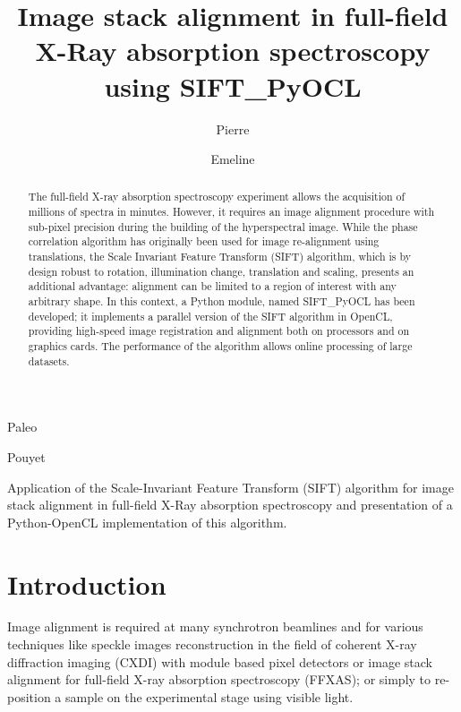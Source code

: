 \documentclass[preprint]{iucr}
\begin{document}
\title{Image stack alignment in full-field X-Ray absorption spectroscopy using
SIFT\_PyOCL}

    \author[a]{Pierre}{Paleo}
    \author[a]{Emeline}{Pouyet}

\maketitle

\begin{synopsis}
Application of the Scale-Invariant Feature Transform (SIFT) algorithm for image
stack alignment in full-field X-Ray absorption spectroscopy and presentation of
a Python-OpenCL implementation of this algorithm.
\end{synopsis}

\begin{abstract}
The full-field X-ray absorption spectroscopy experiment allows the acquisition
of millions of spectra in minutes. However, it requires an image alignment
procedure with sub-pixel precision during the building of the
hyperspectral image.
While the phase correlation algorithm has originally been used for image
re-alignment using translations, the Scale Invariant Feature Transform (SIFT)
algorithm, which is by design robust to rotation, illumination change,
translation and scaling, presents an additional advantage: alignment can be limited to
a region of interest with any arbitrary shape.
In this context, a Python module, named  SIFT\_PyOCL has been developed;
it implements a parallel version of the SIFT algorithm in OpenCL, providing
high-speed image registration and alignment both on processors and on graphics cards.
The performance of the algorithm allows online processing of large datasets.

\end{abstract}

\section{Introduction}

Image alignment is required at many synchrotron beamlines and for
various techniques like speckle images reconstruction in the field of coherent
X-ray diffraction imaging (CXDI) with module based pixel detectors or image
stack alignment for full-field X-ray absorption spectroscopy (FFXAS); or
simply to re-position a sample on the experimental stage using visible light.
\end{document}
